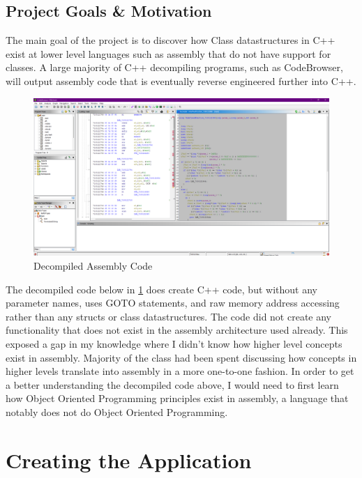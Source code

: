 \documentclass[twoside]{article}
\begin{document}
    \subsection{Project Goals \& Motivation}\label{subsec:project-goals}
    The main goal of the project is to discover how Class datastructures in C++ exist at lower level languages such as assembly that do not have support for classes.
    A large majority of C++ decompiling programs, such as CodeBrowser, will output assembly code that is eventually reverse engineered further into C++.

    \begin{figure}[hbtp]
        \centering
        \includegraphics[width=\textwidth]{DecompiledAssembly}
        \caption {Decompiled Assembly Code}
        \label{fig:DecompiledAssemblyImage}
    \end{figure}

    \bigbreak
    \noindent
    The decompiled code below in \ref{fig:DecompiledAssemblyImage} does create C++ code, but without any parameter names, uses GOTO statements, and raw memory address accessing rather than any structs or class datastructures.
    The code did not create any functionality that does not exist in the assembly architecture used already.
    This exposed a gap in my knowledge where I didn't know how higher level concepts exist in assembly.
    Majority of the class had been spent discussing how concepts in higher levels translate into assembly in a more one-to-one fashion.
    In order to get a better understanding the decompiled code above, I would need to first learn how Object Oriented Programming principles exist in assembly, a language that notably does not do Object Oriented Programming.


    \section{Creating the Application}\label{sec:creating-the-application}
\end{document}
